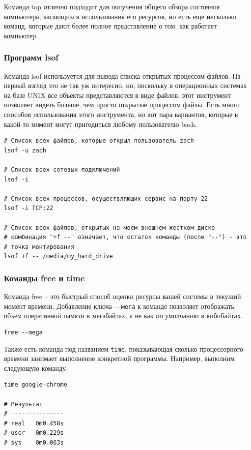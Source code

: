 \documentclass[12pt]{article}
\begin{document}
Команда top отлично подходит для получения общего обзора состояния
компьютера, касающихся использования его ресурсов, но есть еще несколько
команд, которые дают более полное представление о том, как работает
компьютер.

\hypertarget{lsof}{%
\subsubsection{\texorpdfstring{\protect\hyperlink{lsof}{}Программ
lsof}{Программ lsof}}\label{lsof}}

Команда lsof используется для вывода списка открытых процессом файлов.
На первый взгляд это не так уж интересно, но, поскольку в операционных
системах на базе UNIX все объекты представляются в виде файлов, этот
инструмент позволяет видеть больше, чем просто открытые процессом файлы.
Есть много способов использования этого инструмента, но вот пара
вариантов, которые в какой-то момент могут пригодиться любому
пользователю bash.
\begin{verbatim}
# Список всех файлов, которые открыл пользователь zach
lsof -u zach

# Список всех сетевых подключений
lsof -i

# Список всех процессов, осуществляющих сервис на порту 22
lsof -i TCP:22

# Список всех файлов, открытых на моем внешнем жестком диске
# комбинация "+f --" означает, что остаток команды (после "--") - это
# точка монтирования
lsof +f -- /media/my_hard_drive
\end{verbatim}

\hypertarget{free-time}{%
\subsubsection{\texorpdfstring{\protect\hyperlink{free-time}{}Команды
free и time}{Команды free и time}}\label{free-time}}

Команда free -- это быстрый способ оценки ресурсы вашей системы в
текущий момент времени. Добавление ключа \texttt{-\/-мега} к команде позволяет
отображать объем оперативной памяти в мегабайтах, а не как по умолчанию
в кибибайтах.
\begin{verbatim}
free --mega
\end{verbatim}

Также есть команда под названием \texttt{time}, показывающая сколько
процессорного времени занимает выполнение конкретной программы.
Например, выполним следующую команду.
\begin{verbatim}
time google-chrome

# Результат
# ---------------
# real   0m0.458s
# user   0m0.229s
# sys    0m0.063s
\end{verbatim}
\end{document}
